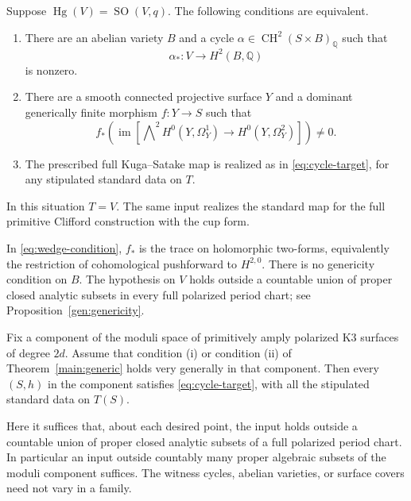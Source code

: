 \begin{theorem}\label{main:generic}
Suppose $\operatorname{Hg}(V)=\operatorname{SO}(V,q)$. The following conditions are equivalent.
\begin{enumerate}
\item There are an abelian variety $B$ and a cycle $\alpha\in\operatorname{CH}^2(S\times B)_{\mathbb Q}$ such that
\[
 \alpha_*:V\longrightarrow H^2(B,\mathbb Q)
\]
is nonzero.
\item There are a smooth connected projective surface $Y$ and a dominant generically finite morphism $f:Y\to S$ such that
\begin{equation}\label{eq:wedge-condition}
 f_*\!\left(\operatorname{im}\!\left[
 \bigwedge\nolimits^2 H^0(Y,\Omega_Y^1)
 \longrightarrow H^0(Y,\Omega_Y^2)\right]\right)\ne0.
\end{equation}
\item The prescribed full Kuga--Satake map is realized as in \eqref{eq:cycle-target}, for any stipulated standard data on $T$.
\end{enumerate}
In this situation $T=V$. The same input realizes the standard map for the full primitive Clifford construction with the cup form.
\end{theorem}

In \eqref{eq:wedge-condition}, $f_*$ is the trace on holomorphic two-forms, equivalently the restriction of cohomological pushforward to $H^{2,0}$. There is no genericity condition on $B$. The hypothesis on $V$ holds outside a countable union of proper closed analytic subsets in every full polarized period chart; see Proposition~\ref{gen:genericity}.

\begin{theorem}\label{main:specialization}
Fix a component of the moduli space of primitively amply polarized K3 surfaces of degree $2d$. Assume that condition \textup{(i)} or condition \textup{(ii)} of Theorem~\ref{main:generic} holds very generally in that component. Then every $(S,h)$ in the component satisfies \eqref{eq:cycle-target}, with all the stipulated standard data on $T(S)$.

Here it suffices that, about each desired point, the input holds outside a countable union of proper closed analytic subsets of a full polarized period chart. In particular an input outside countably many proper algebraic subsets of the moduli component suffices. The witness cycles, abelian varieties, or surface covers need not vary in a family.
\end{theorem}

